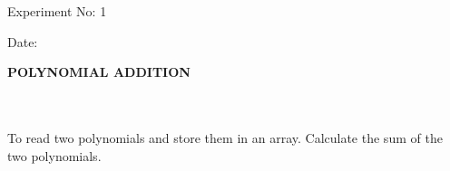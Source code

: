 \documentclass{article}
\begin{document}
\begin{flushright}



    {\fontsize{12}{12}\selectfont \textmd 
    Experiment No: 1
    } \\



    \vspace{0.16cm}



    {\fontsize{12}{12}\selectfont \textmd 
    Date:  \hspace{2.08cm}
    }
\end{flushright}





\vspace{1.5cm}





\begin{center}



    {\fontsize{24}{28}\selectfont \bfseries 
     POLYNOMIAL ADDITION
    } \\


    
    \vspace{1.5cm}


    
\end{center}





\vspace{1.8cm}





 \\ \\
To read two polynomials and store them in an array. Calculate the sum of the two polynomials.





\vspace{1cm}
\end{document}
